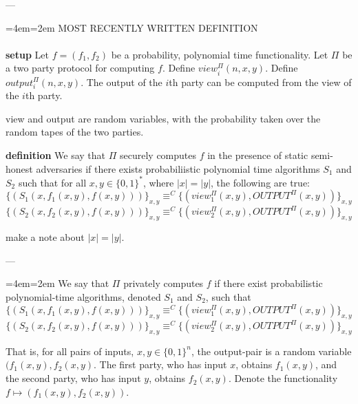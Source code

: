 \documentclass[12pt,twoside]{reedthesis}
\newenvironment{blockquote}{%
  \par%
  \medskip
  \leftskip=4em\rightskip=2em%
  \noindent\ignorespaces}{%
  \par\medskip}
\begin{document}
---
\begin{blockquote}
MOST RECENTLY WRITTEN DEFINITION \\\\
\textbf{setup}
Let $f = (f_1, f_2)$ be a probability, polynomial time functionality. 
Let $\Pi$ be a two party protocol for computing $f$. 
Define $view_i^{\Pi}(n,x,y)$.
Define $output^{\Pi}_i(n,x,y)$.
The output of the $i$th party can be computed from the view of the $i$th party.

view and output are random variables, with the probability taken over the random tapes of the two parties.

\textbf{definition}
We say that $\Pi$ securely computes $f$ in the presence of static semi-honest adversaries if there exists probabiliistic polynomial time algorithms $S_1$ and $S_2$ such that for all $x,y \in \{0,1\}^*$, where $|x| = |y|$, the following are true:
\begin{equation} 
    \{(S_1(x, f_1(x,y), f(x,y)))\}_{x,y} \equiv^C \{(view^{\Pi}_1(x,y), OUTPUT^{\Pi}(x,y)) \}_{x,y} 
\end{equation}
\begin{equation} 
    \{(S_2(x, f_2(x,y), f(x,y)))\}_{x,y} \equiv^C \{(view^{\Pi}_2(x,y), OUTPUT^{\Pi}(x,y)) \}_{x,y} 
\end{equation}

make a note about $|x| = |y|$. 
\end{blockquote}
---

\begin{blockquote}
We say that $\Pi$ privately computes $f$ if there exist probabilistic polynomial-time algorithms, denoted $S_1$ and $S_2$, such that
\begin{equation} 
    \{(S_1(x, f_1(x,y), f(x,y)))\}_{x,y} \equiv^C \{(view^{\Pi}_1(x,y), OUTPUT^{\Pi}(x,y)) \}_{x,y} 
\end{equation}
\begin{equation} 
    \{(S_2(x, f_2(x,y), f(x,y)))\}_{x,y} \equiv^C \{(view^{\Pi}_2(x,y), OUTPUT^{\Pi}(x,y)) \}_{x,y} 
\end{equation}


That is, for all pairs of inputs, $x,y \in \{0,1\}^n$, the output-pair is a random variable $(f_1(x,y), f_2(x,y)$.
The first party, who has input $x$, obtains $f_1(x,y)$, and the second party, who has input $y$, obtains $f_2(x,y)$.
Denote the functionality $f \mapsto (f_1(x,y), f_2(x,y))$.

\end{blockquote}
\end{document}
